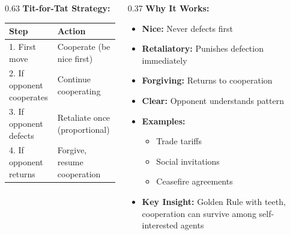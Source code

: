 \begin{frame}[fragile]
\begin{columns}
\begin{column}[T]{0.63\linewidth}
      \textbf{Tit-for-Tat Strategy:}
      \begin{center}
      \small
      \begin{tabular}{|l|l|}
        \hline
        \textbf{Step} & \textbf{Action} \\
        \hline
        1. First move & Cooperate (be nice first) \\
        2. If opponent cooperates & Continue cooperating \\
        3. If opponent defects & Retaliate once (proportional) \\
        4. If opponent returns & Forgive, resume cooperation \\
        \hline
      \end{tabular}
      \end{center}
    \end{column}
    \begin{column}[T]{0.37\linewidth}
      \textbf{Why It Works:}
      \begin{itemize}
        \item \textbf{Nice:} Never defects first
        \item \textbf{Retaliatory:} Punishes defection immediately
        \item \textbf{Forgiving:} Returns to cooperation
        \item \textbf{Clear:} Opponent understands pattern
        \item \textbf{Examples:}
        \begin{itemize}
          \item Trade tariffs
          \item Social invitations
          \item Ceasefire agreements
        \end{itemize}
        \item \textbf{Key Insight:} Golden Rule with teeth, cooperation can survive among self-interested agents
      \end{itemize}
    \end{column}
  \end{columns}
\end{frame}


